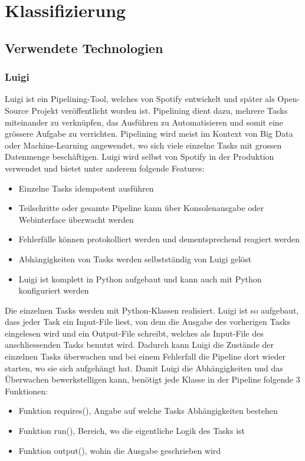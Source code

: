 \section{Klassifizierung}
\subsection{Verwendete Technologien}
\subsubsection{Luigi}
Luigi ist ein Pipelining-Tool, welches von Spotify entwickelt und später als Open-Source Projekt veröffentlicht worden ist.
Pipelining dient dazu, mehrere Tasks miteinander zu verknüpfen, das Ausführen zu Automatisieren und somit eine grössere Aufgabe zu verrichten.
Pipelining wird meist im Kontext von Big Data oder Machine-Learning angewendet, wo sich viele einzelne Tasks mit grossen Datenmenge beschäftigen.
Luigi wird selbst von Spotify in der Produktion verwendet und bietet unter anderem folgende Features:
\begin{itemize}
	\item Einzelne Tasks idempotent ausführen
	\item Teilschritte oder gesamte Pipeline kann über Konsolenausgabe oder Webinterface überwacht werden
	\item Fehlerfälle können protokolliert werden und dementsprechend reagiert werden
	\item Abhängigkeiten von Tasks werden selbstständig von Luigi gelöst
	\item Luigi ist komplett in Python aufgebaut und kann auch mit Python konfiguriert werden
\end{itemize}
Die einzelnen Tasks werden mit Python-Klassen realisiert.
Luigi ist so aufgebaut, dass jeder Task ein Input-File liest, von dem die Ausgabe des vorherigen Tasks eingelesen wird und ein Output-File schreibt, welches als Input-File des anschliessenden Tasks benutzt wird.
Dadurch kann Luigi die Zustände der einzelnen Tasks überwachen und bei einem Fehlerfall die Pipeline dort wieder starten, wo sie sich aufgehängt hat.
Damit Luigi die Abhängigkeiten und das Überwachen bewerkstelligen kann, benötigt jede Klasse in der Pipeline folgende 3 Funktionen:
\begin{itemize}
	\item Funktion requires(), Angabe auf welche Tasks Abhängigkeiten bestehen
	\item Funktion run(), Bereich, wo die eigentliche Logik des Tasks ist
	\item Funktion output(), wohin die Ausgabe geschrieben wird
\end{itemize}
